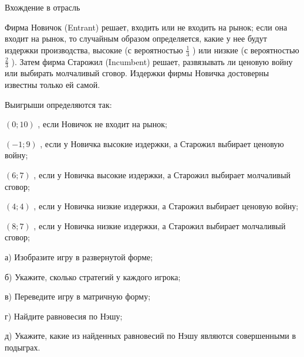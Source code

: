 \begin{problem}
 Вхождение в отрасль\par
Фирма Новичок (Entrant) решает, входить или не входить на рынок; если она входит на рынок, то случайным образом определяется, какие у нее будут издержки производства, высокие (с вероятностью  $\frac{1}{3} $ ) или низкие (с вероятностью  $\frac{2}{3} $ ). Затем фирма Старожил (Incumbent) решает, развязывать ли ценовую войну или выбирать молчаливый сговор. Издержки фирмы Новичка достоверны известны только ей самой.\par
Выигрыши определяются так:\par
$\displaystyle \left(0;10\right)$ , если Новичок не входит на рынок;\par
$\displaystyle \left(-1;9\right)$ , если у Новичка высокие издержки, а Старожил выбирает ценовую войну;\par
$\displaystyle \left(6;7\right)$ , если у Новичка высокие издержки, а Старожил выбирает молчаливый сговор;\par
$\displaystyle \left(4;4\right)$ , если у Новичка низкие издержки, а Старожил выбирает ценовую войну;\par
$\displaystyle \left(8;7\right)$ , если у Новичка низкие издержки, а Старожил выбирает молчаливый сговор;\par
а) Изобразите игру в развернутой форме;\par
б) Укажите, сколько стратегий у каждого игрока;\par
в) Переведите игру в матричную форму;\par
г) Найдите равновесия по Нэшу;\par
д) Укажите, какие из найденных равновесий по Нэшу являются совершенными в подыграх.\par



\begin{sol}

\end{sol}
\end{problem}



